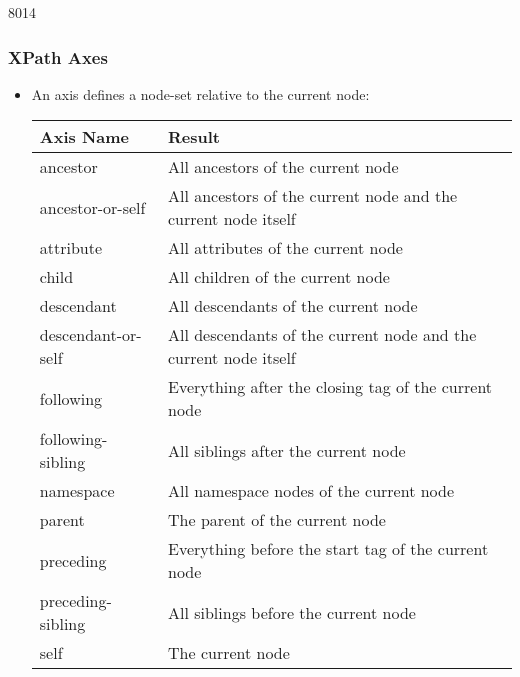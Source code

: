 \begin{slide}[fragile]{8014}
\frametitle{XPath Axes}
\begin{itemize}
\item An axis defines a node-set relative to the current node:
\begin{center}
\begin{tabular}{|l|l|}
\hline
\textbf{Axis Name}  & \textbf{Result} \\ \hline
ancestor            & All ancestors of the current node \\ \hline
ancestor-or-self    & All ancestors of the current node and the current node itself \\ \hline
attribute           & All attributes of the current node \\ \hline
child               & All children of the current node \\ \hline
descendant          & All descendants of the current node \\ \hline
descendant-or-self  & All descendants of the current node and the current node itself \\ \hline
following           & Everything after the closing tag of the current node \\ \hline
following-sibling   & All siblings after the current node \\ \hline
namespace           & All namespace nodes of the current node \\ \hline
parent              & The parent of the current node \\ \hline
preceding           & Everything before the start tag of the current node \\ \hline
preceding-sibling   & All siblings before the current node \\ \hline
self                & The current node \\ \hline
\end{tabular}
\end{center}
\end{itemize}
\end{slide}


